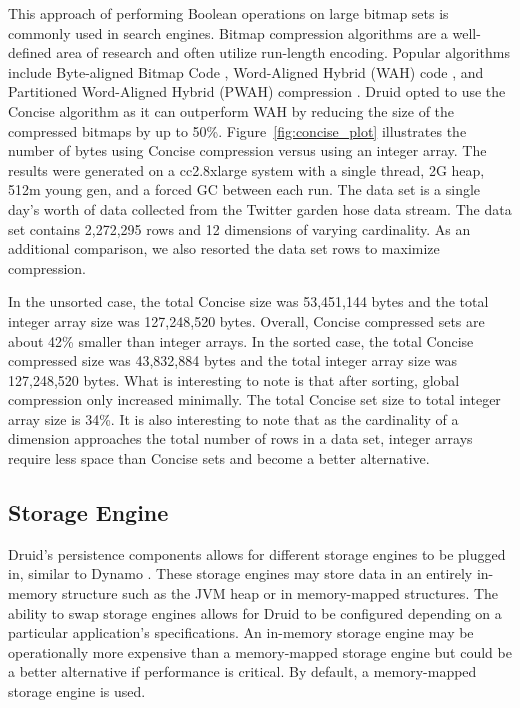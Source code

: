 \documentclass{acm_proc_article-sp}
\begin{document}
This approach of performing Boolean operations on large bitmap sets is commonly
used in search engines. Bitmap compression algorithms are a well-defined area
of research and often utilize run-length encoding. Popular algorithms include
Byte-aligned Bitmap Code \cite{antoshenkov1995byte}, Word-Aligned Hybrid (WAH)
code \cite{wu2006optimizing}, and Partitioned Word-Aligned Hybrid (PWAH)
compression \cite{van2011memory}. Druid opted to use the Concise algorithm
\cite{colantonio2010concise} as it can outperform WAH by reducing the size of
the compressed bitmaps by up to 50\%.  Figure~\ref{fig:concise_plot}
illustrates the number of bytes using Concise compression versus using an
integer array. The results were generated on a cc2.8xlarge system with a single
thread, 2G heap, 512m young gen, and a forced GC between each run. The data set
is a single day’s worth of data collected from the Twitter garden hose
\cite{twitter2013} data stream. The data set contains 2,272,295 rows and 12
dimensions of varying cardinality. As an additional comparison, we also
resorted the data set rows to maximize compression.

In the unsorted case, the total Concise size was 53,451,144 bytes and the total
integer array size was 127,248,520 bytes. Overall, Concise compressed sets are
about 42\% smaller than integer arrays.  In the sorted case, the total Concise
compressed size was 43,832,884 bytes and the total integer array size was
127,248,520 bytes.  What is interesting to note is that after sorting, global
compression only increased minimally. The total Concise set size to total
integer array size is 34\%. It is also interesting to note that as the
cardinality of a dimension approaches the total number of rows in a data set,
integer arrays require less space than Concise sets and become a better
alternative.

\subsection{Storage Engine}
Druid’s persistence components allows for different storage engines to be
plugged in, similar to Dynamo \cite{decandia2007dynamo}. These storage engines
may store data in an entirely in-memory structure such as the JVM heap or in
memory-mapped structures. The ability to swap storage engines allows for Druid
to be configured depending on a particular application’s specifications. An
in-memory storage engine may be operationally more expensive than a
memory-mapped storage engine but could be a better alternative if performance
is critical. By default, a memory-mapped storage engine is used.
\end{document}
